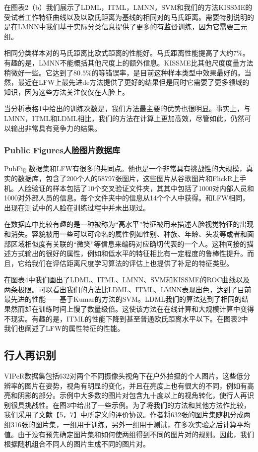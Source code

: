 在图表2（b）我们展示了LDML，ITML，LMNN，SVM和我们的方法KISSME的受试者工作特征曲线以及以欧氏距离为基线的相同对的马氏距离。需要特别说明的是在LMNN中我们基于实际分类信息提供了更多的有监督训练，因为它需要三元组。

相同分类样本对的马氏距离比欧式距离的性能好。马氏距离性能提高了大约$7\%$。有趣的是，LMNN不能概括其他尺度上的额外信息。KISSME比其他尺度度量方法稍微好一些。它达到了$80.5\%$的等错误率，是目前这种样本类型中效果最好的。当然，最近在LFW上最先进de方法提供了更好的结果但是同时它需要了更多领域的知识，因为这些方法关注仅仅在人脸上。

当分析表格1中给出的训练次数是，我们方法最主要的优势也很明显。事实上，与LMNN，ITML和LDML相比，我们的方法在计算上更加高效，尽管如此，仍然可以输出非常具有竞争力的结果。

\subsubsection{Public Figures人脸图片数据库}
PubFig 数据集和LFW有很多的共同点。他也是一个非常具有挑战性的大规模，真实的数据库，包含了200个人的58797张图片，这些图片从谷歌图片和FlickR上手机。人脸验证的样本包括了10个交叉验证文件夹，其其中包括了1000对内部人员和1000对外部人员的信息。每个文件夹中的信息从14个个人中获得。和LFW相同，出现在测试中的人脸在训练过程中并未出现过。

在数据库中比较有趣的是一种被称为“高水平”特征被用来描述人脸视觉特征的出现和消失。容貌被用一些可以可命名的属性例如性别、种族、年龄、头发等或者和面部区域相似度有关联的“微笑”等信息来编码对应确切代表的一个人。这种间接的描述方式输出的很好的属性，例如和低水平的特征相比有一定程度的鲁棒性提升。而且，它给我们在评估距离尺度学习算法的评估上也提供了补足的特征类型。

在图表4中我们画出了LDML、ITML、LMNN、SVM和KISSME的ROC曲线以及两条极限。可以看出我们的方法比LDML、ITML、LMNN表现出色，达到了目前最先进的性能——基于Kumar的方法的SVM。LDML我们的算法达到了相同的结果然而却在训练时间上慢了数量级倍。这使该方法在在线计算和大规模计算中变得不现实。有趣的是，ITML的性能下降到甚至普通欧氏距离水平以下。在图表2中我们也阐述了LFW的属性特征的性能。

\subsection{行人再识别}

VIPeR数据集包括632对两个不同摄像头视角下在户外拍摄的个人图片。这些低分辨率的图片在姿势，视角有明显的变化，并且在亮度上也有很大的不同，例如有高亮和阴影的部分。示例中大多数的图片对包含九十度以上的视角转化，使行人再识别很具挑战性。在图3中给出了一些示例。为了将我们的方法和其他方法作比较，我们采用了文献【5，7】中所定义的评价协议。作者将632张的图片集随机分成两组316张的图片集，一组用于训练，另外一组用于测试，在多次实验之后计算平均值。由于没有预先确定图片集和如何使两组得到不同的图片对的规则。因此，我们根据随机组合不同人的图片生成不同的图片对。

